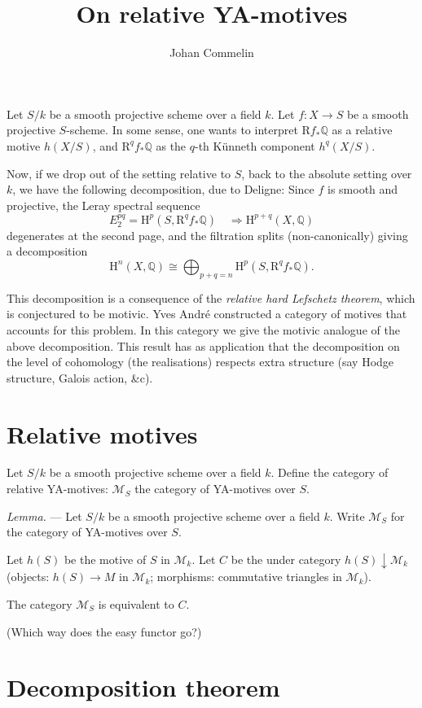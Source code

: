 \documentclass[a4paper,10pt]{article}
\title{On relative YA-motives}
\author{Johan Commelin}
\newenvironment{lemma}{\textit{Lemma.} --- }{}
\begin{document}
\maketitle

Let $S/k$ be a smooth projective scheme over a field $k$. Let $f \colon X \to
S$ be a smooth projective $S$-scheme. In some sense, one wants to interpret
$\textrm{R}f_{*}\mathbb{Q}$ as a relative motive $h(X/S)$, and
$\textrm{R}^{q}f_{*}\mathbb{Q}$ as the $q$-th K\"{u}nneth component
$h^{q}(X/S)$.

Now, if we drop out of the setting relative to $S$, back to the absolute
setting over $k$, we have the following decomposition, due to Deligne:
Since $f$ is smooth and projective, the Leray spectral sequence
\[
	E_{2}^{pq} = \textrm{H}^{p}(S, \textrm{R}^{q}f_{*}\mathbb{Q})
	\quad \Rightarrow \textrm{H}^{p+q}(X, \mathbb{Q})
\]
degenerates at the second page, and the filtration splits (non-canonically)
giving a decomposition
\[
	\textrm{H}^{n}(X, \mathbb{Q}) \cong \bigoplus_{p+q = n}
	\textrm{H}^{p}(S, \textrm{R}^{q}f_{*}\mathbb{Q}).
\]

This decomposition is a consequence of the \emph{relative hard Lefschetz
theorem}, which is conjectured to be motivic. Yves Andr\'{e} constructed a
category of motives that accounts for this problem. In this category we give
the motivic analogue of the above decomposition. This result has as application
that the decomposition on the level of cohomology (the realisations) respects
extra structure (say Hodge structure, Galois action, \&c).

\section{Relative motives}

Let $S/k$ be a smooth projective scheme over a field $k$. Define the category
of relative YA-motives: $\mathcal{M}_{S}$ the category of YA-motives over $S$.

\begin{lemma} %
	Let $S/k$ be a smooth projective scheme over a field $k$. Write
	$\mathcal{M}_{S}$ for the category of YA-motives over $S$.

	Let $h(S)$ be the motive of $S$ in $\mathcal{M}_{k}$. Let $C$ be the
	under category $h(S) \downarrow \mathcal{M}_{k}$ (objects: $h(S) \to M$
	in $\mathcal{M}_{k}$; morphisms: commutative triangles in
	$\mathcal{M}_{k}$).

	The category $\mathcal{M}_{S}$ is equivalent to $C$.
	
	(Which way does the easy functor go?)
\end{lemma} %


\section{Decomposition theorem}
\end{document}
